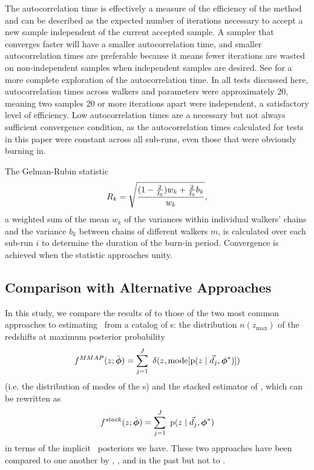 The autocorrelation time is effectively a measure of the efficiency of the method and can be described as the expected number of iterations necessary to accept a new sample independent of the current accepted sample.  
A sampler that converges faster will have a smaller autocorrelation time, and smaller autocorrelation times are preferable because it means fewer iterations are wasted on non-independent samples when independent samples are desired.  
See \citet{Foreman-Mackey2013} for a more complete exploration of the autocorrelation time.  
In all tests discussed here, autocorrelation times across walkers and parameters were approximately 20, meaning two samples 20 or more iterations apart were independent, a satisfactory level of efficiency.  
Low autocorrelation times are a necessary but not always sufficient convergence condition, as the autocorrelation times calculated for tests in this paper were constant across all sub-runs, even those that were obviously burning in.  

The Gelman-Rubin statistic
\begin{equation}
\eqlabel{eqn:gr}
R_{k} = \sqrt{\frac{(1 - \frac{2}{I_{0}}) w_{k} + \frac{2}{I_{0}} b_{k}}{w_{k}}},
\end{equation}
a weighted sum of the mean $w_{k}$ of the variances within individual walkers' chains and the variance $b_{k}$ between chains of different walkers $m$, is calculated over each sub-run $i$ to determine the duration of the burn-in period.  
Convergence is achieved when the statistic approaches unity.  

\subsection{Comparison with Alternative Approaches}

In this study, we compare the results of  to those of the two most common approaches to estimating \nz\ from a catalog of \pzpdf s: the distribution $n(z_{\mathrm{max}})$ of the redshifts at maximum posterior probability
\begin{equation}
\eqlabel{eqn:mmap}
f^{MMAP}(z; \hat{\ndphi}) = \sum_{j=1}^{J}\ \delta(z, \mathrm{mode}[\pr{z \gvn \data_{j}, \ndphi^{*}}])
\end{equation}
(i.e. the distribution of modes of the \pzpdf s) and the stacked estimator of , which can be rewritten as 
\begin{equation}
\eqlabel{eqn:stacked}
f^{stack}(z; \hat{\ndphi}) = \sum_{j=1}^{J}\ \pr{z \gvn \data_{j}, \ndphi^{*}}
\end{equation}
in terms of the implicit \pz\ posteriors we have.
These two approaches have been compared to one another by \citet{Hildebrandt2012}, \citet{Benjamin2013}, and \citet{Asorey2016} in the past but not to \Chippr.

